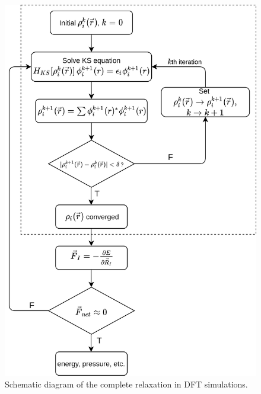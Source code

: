 \begin{figure}[tbh!]
	\centering
	\includegraphics[width=0.65\linewidth]{"images/computational/ionic_relax"}
	\caption[ Schematic diagram of the complete relaxation in DFT simulations]{Schematic diagram of the complete relaxation in DFT simulations.}
	\label{fig:ionic_relax}
\end{figure}



